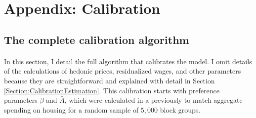 \documentclass[12pt]{article}
\begin{document}
	
	
	\clearpage
	
	
	\section{Appendix: Calibration}\label{Appendix:Calibration}	
	
	\subsection{The complete calibration algorithm}
	\paragraph*{}
	In this section, I detail the full algorithm that calibrates the model. I omit details of the calculations of hedonic prices, residualized wages, and other parameters because they are straightforward and explained with detail in Section \ref{Section:CalibrationEstimation}. This calibration starts with preference parameters $\beta$ and $\bar{A}$, which were calculated in a previously to match aggregate spending on housing for a random sample of $5,000$ block groups.  
	
\end{document}
